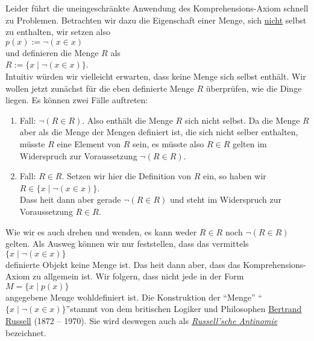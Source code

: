 Leider f\"{u}hrt die uneingeschr\"{a}nkte Anwendung des Komprehensions-Axiom schnell zu
Problemen.  Betrachten wir dazu die Eigenschaft einer Menge, sich \underline{nicht} selbst zu
enthalten, wir setzen also
\\[0.2cm]
\hspace*{1.3cm}
 $p(x) := \neg(x \in x)$ 
\\[0.2cm]
und definieren die Menge $R$ als \\[0.2cm]
\hspace*{1.3cm} $R := \{ x \;|\; \neg (x \in x) \}$.  \\[0.2cm]
Intuitiv w\"{u}rden wir vielleicht erwarten, dass keine Menge sich selbst enth\"{a}lt.  Wir wollen
jetzt zun\"{a}chst f\"{u}r die eben definierte Menge $R$ \"{u}berpr\"{u}fen, wie die Dinge liegen.
Es k\"{o}nnen zwei F\"{a}lle auftreten:
\begin{enumerate}
\item Fall: $\neg (R \in R)$. Also enth\"{a}lt die Menge $R$ sich nicht selbst.
      Da die Menge $R$ aber als die Menge der Mengen definiert ist, die sich nicht selber
      enthalten, m\"{u}sste $R$ eine Element von $R$ sein, es m\"{u}sste also
      $R \in R$ gelten im Widerspruch zur Voraussetzung $\neg (R \in R)$.
\item Fall: $R \in R$. Setzen wir hier die Definition von $R$ ein, so haben wir \\[0.2cm]
      \hspace*{1.3cm}  $R \in \{ x \;|\; \neg(x \in x) \}$. \\[0.2cm]
      Dass hei\3t dann aber gerade $\neg (R \in R)$ und steht im Widerspruch zur
      Voraussetzung $R \in R$.
\end{enumerate}
Wie wir es auch drehen und wenden, es kann weder $R \in R$ noch $\neg (R \in R)$ gelten. 
Als Ausweg k\"{o}nnen wir nur feststellen, dass das vermittels \\[0.2cm]
\hspace*{1.3cm} $\{ x \mid \neg (x \in x) \}$ \\[0.2cm]
definierte Objekt keine Menge ist.
Das hei\3t dann aber, dass das Komprehensions-Axiom
zu allgemein ist.  Wir folgern, dass nicht jede  in der Form \\[0.2cm]
\hspace*{1.3cm} $M = \{ x \mid p(x) \}$ \\[0.2cm]
angegebene Menge wohldefiniert ist.  Die Konstruktion der ``Menge''
 ``$\{x \mid \neg(x \in x)\}$''stammt von dem britischen Logiker und Philosophen 
\href{http://de.wikipedia.org/wiki/Bertrand_Russell}{Bertrand Russell} (1872 -- 1970).  Sie wird
deswegen auch als 
\href{http://de.wikipedia.org/wiki/Russellsche_Antinomie}{\emph{Russell'sche Antinomie}}
 bezeichnet. 


